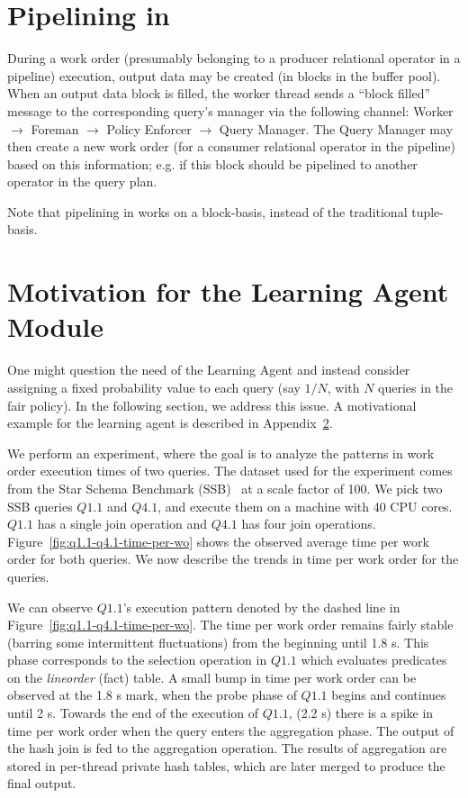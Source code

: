 \section{Pipelining in \sys{}}\label{apx:pipelining}
During a work order (presumably belonging to a producer relational operator in a pipeline) execution, output data may be created (in blocks in the buffer pool). 
When an output data block is filled, the worker thread sends a ``block filled'' message to the corresponding query's manager via the following channel: Worker $\rightarrow$ Foreman $\rightarrow$ Policy Enforcer $\rightarrow$ Query Manager.
The Query Manager may then create a new work order (for a consumer relational operator in the pipeline) based on this information;
e.g. if this block should be pipelined to another operator in the query plan.

Note that pipelining in \sys{} works on a block-basis, instead of the traditional tuple-basis.

\section{Motivation for the Learning Agent Module}\label{apx:learning-motivation}
One might question the need of the Learning Agent and instead consider assigning a fixed probability value to each query (say $1/N$, with $N$ queries in the fair policy).
In the following section, we address this issue. 
A motivational example for the learning agent is described in Appendix~\ref{apx:learning-motivation}.

We perform an experiment, where the goal is to analyze the patterns in work order execution times of two queries. 
The dataset used for the experiment comes from the Star Schema Benchmark (SSB)~\cite{ssb} 
at a scale factor of 100. %
We pick two SSB queries $Q1.1$ and $Q4.1$, and execute them on a machine with 40 CPU cores. 
$Q1.1$ has a single join operation and $Q4.1$ has four join operations.
Figure~\ref{fig:q1.1-q4.1-time-per-wo} shows the observed average time per work order for both queries.
We now describe the trends in time per work order for the queries.

We can observe $Q1.1$'s execution pattern denoted by the dashed line in Figure~\ref{fig:q1.1-q4.1-time-per-wo}. 
The time per work order remains fairly stable (barring some intermittent fluctuations) from the beginning until 1.8 s.
This phase corresponds to the selection operation in $Q1.1$ which evaluates predicates on the \textit{lineorder} (fact) table.
A small bump in time per work order can be observed at the 1.8 s mark, when the probe phase of $Q1.1$ begins and continues until 2 s.
Towards the end of the execution of $Q1.1$, (2.2 s) there is a spike in time per work order when the query enters the aggregation phase. 
The output of the hash join is fed to the aggregation operation. 
The results of aggregation are stored in per-thread private hash tables, which are later merged to produce the final output.

